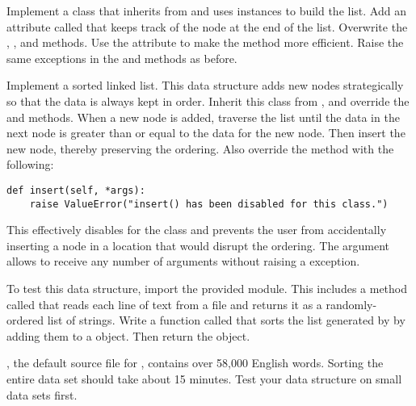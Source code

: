 \begin{problem}
Implement a  class that inherits from  and uses  instances to build the list.
Add an attribute called  that keeps track of the node at the end of the list.
Overwrite the , , and  methods.
Use the  attribute to make the  method more efficient.
Raise the same exceptions in the  and  methods as before.
\end{problem}

\begin{problem}
Implement a sorted linked list.
This data structure adds new nodes strategically so that the data is always kept in order.
Inherit this class from , and override the  and  methods.
When a new node is added, traverse the list until the data in the next node is greater than or equal to the data for the new node.
Then insert the new node, thereby preserving the ordering.
Also override the  method with the following:

\begin{lstlisting}
def insert(self, *args):
	raise ValueError("insert() has been disabled for this class.")
\end{lstlisting}

This effectively disables  for the  class and prevents the user from accidentally inserting a node in a location that would disrupt the ordering.
The  argument allows  to receive any number of arguments without raising a  exception.

To test this data structure, import the provided  module.
This includes a method called  that reads each line of text from a file and returns it as a randomly-ordered list of strings.
Write a function called  that sorts the list generated by  by adding them to a  object.
Then return the object.

\begin{warn}
, the default source file for , contains over 58,000 English words.
Sorting the entire data set should take about 15 minutes.
Test your data structure on small data sets first.
\end{warn}
\end{problem}

